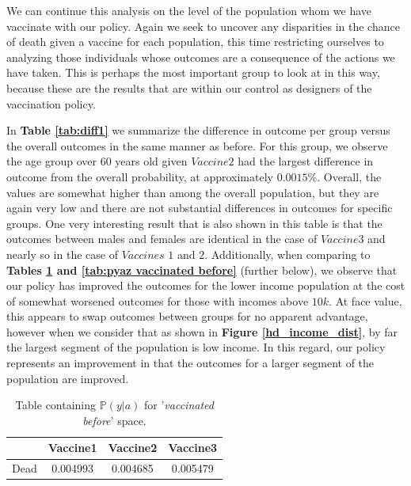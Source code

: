 \documentclass{article}
\begin{document}
We can continue this analysis on the level of the population whom we have vaccinate with our policy. Again we seek to uncover any disparities in the chance of death given a vaccine for each population, this time restricting ourselves to analyzing those individuals whose outcomes are a consequence of the actions we have taken. This is perhaps the most important group to look at in this way, because these are the results that are within our control as designers of the vaccination policy.

In \textbf{Table \ref{tab:diff1}} we summarize the difference in outcome per group versus the overall outcomes in the same manner as before. For this group, we observe the age group over $60$ years old given $Vaccine2$ had the largest difference in outcome from the overall probability, at approximately $0.0015\%$. Overall, the values are somewhat higher than among the overall population, but they are again very low and there are not substantial differences in outcomes for specific groups. One very interesting result that is also shown in this table is that the outcomes between males and females are identical in the case of $Vaccine3$  and nearly so in the case of $Vaccines$ $1$ and $2$. Additionally, when comparing to \textbf{Tables \ref{tab:pya vaccinated before} and \ref{tab:pyaz vaccinated before}} (further below), we observe that our policy has improved the outcomes for the lower income population at the cost of somewhat worsened outcomes for those with incomes above $10k$. At face value, this appears to swap outcomes between groups for no apparent advantage, however when we consider that as shown in \textbf{Figure \ref{hd_income_dist}}, by far the largest segment of the population is low income. In this regard, our policy represents an improvement in that the outcomes for a larger segment of the population are improved.

\begin{center}
    \begin{table}[H]
    \centering
        \begin{tabular}{ |c| c c c|}
            \hline
            & Vaccine1 &  Vaccine2 & Vaccine3  \\
            \hline
            Dead &  0.004993 &  0.004685 &  0.005479 \\
            \hline
        \end{tabular}
    \caption{Table containing $\mathbb{P}(y | a)$ for '\textit{vaccinated before}' space.}
    \label{tab:pya vaccinated before}
    \end{table}
\end{center}
\end{document}
